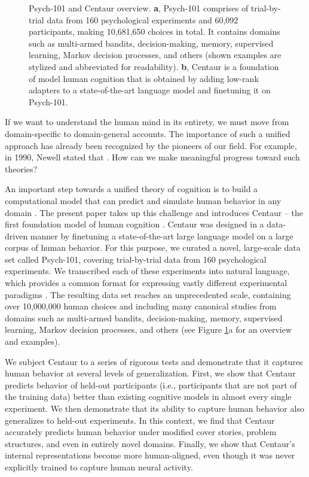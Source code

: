 \documentclass[pdflatex,sn-nature]{sn-jnl}%
\theoremstyle{thmstyleone}%
\theoremstyle{thmstyletwo}%
\theoremstyle{thmstylethree}%
\begin{document}
\begin{figure}
{\begin{tikzpicture}[font={\fontfamily{phv}\selectfont\footnotesize\sffamily}]
    \end{tikzpicture}}
    \caption{Psych-101 and Centaur overview. \textbf{a}, Psych-101 comprises of trial-by-trial data from 160 psychological experiments and 60,092 participants, making 10,681,650 choices in total. It contains domains such as multi-armed bandits, decision-making, memory, supervised learning, Markov decision processes, and others (shown examples are stylized and abbreviated for readability). \textbf{b}, Centaur is a foundation of model human cognition that is obtained by adding low-rank adapters to a state-of-the-art language model and finetuning it on Psych-101.} 
    \label{fig:fig1}
\end{figure}

If we want to understand the human mind in its entirety, we must move from domain-specific to domain-general accounts. The importance of such a unified approach has already been recognized by the pioneers of our field. For example, in 1990, Newell stated that  \cite{Newell1990-NEWUTO}. How can we make meaningful progress toward such theories? 

An important step towards a unified theory of cognition is to build a computational model that can predict and simulate human behavior in any domain \cite{Newell1990-NEWUTO,  riveland2024natural}. The present paper takes up this challenge and introduces Centaur -- the first foundation model of human cognition \cite{bommasani2021opportunities}. Centaur was designed in a data-driven manner by finetuning a state-of-the-art large language model \cite{dubey2024llama} on a large corpus of human behavior. For this purpose, we curated a novel, large-scale data set called Psych-101, covering trial-by-trial data from 160 psychological experiments. We transcribed each of these experiments into natural language, which provides a common format for expressing vastly different experimental paradigms \cite{binz2023using, binz2024turning}. The resulting data set reaches an unprecedented scale, containing over 10,000,000 human choices and including many canonical studies from domains such as multi-armed bandits, decision-making, memory, supervised learning, Markov decision processes, and others (see Figure \ref{fig:fig1}a for an overview and examples).

We subject Centaur to a series of rigorous tests and demonstrate that it captures human behavior at several levels of generalization. First, we show that Centaur predicts behavior of held-out participants (i.e., participants that are not part of the training data) better than existing cognitive models in almost every single experiment. We then demonstrate that its ability to capture human behavior also generalizes to held-out experiments. In this context, we find that Centaur accurately predicts human behavior under modified cover stories, problem structures, and even in entirely novel domains. Finally, we show that Centaur's internal representations become more human-aligned, even though it was never explicitly trained to capture human neural activity. 
\end{document}
